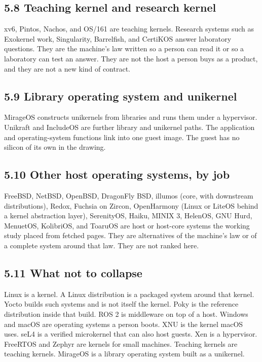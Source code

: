 \documentclass[10pt,letterpaper]{article}
\begin{document}
\subsection{5.8 Teaching kernel and research
kernel}\label{teaching-kernel-and-research-kernel}

xv6, Pintos, Nachos, and OS/161 are teaching kernels. Research systems
such as Exokernel work, Singularity, Barrelfish, and CertiKOS answer
laboratory questions. They are the machine's law written so a person can
read it or so a laboratory can test an answer. They are not the host a
person buys as a product, and they are not a new kind of contract.

\subsection{5.9 Library operating system and
unikernel}\label{library-operating-system-and-unikernel}

MirageOS constructs unikernels from libraries and runs them under a
hypervisor. Unikraft and IncludeOS are further library and unikernel
paths. The application and operating-system functions link into one
guest image. The guest has no silicon of its own in the drawing.

\subsection{5.10 Other host operating systems, by
job}\label{other-host-operating-systems-by-job}

FreeBSD, NetBSD, OpenBSD, DragonFly BSD, illumos (core, with downstream
distributions), Redox, Fuchsia on Zircon, OpenHarmony (Linux or LiteOS
behind a kernel abstraction layer), SerenityOS, Haiku, MINIX 3, HelenOS,
GNU Hurd, MenuetOS, KolibriOS, and ToaruOS are host or host-core systems
the working study placed from fetched pages. They are alternatives of
the machine's law or of a complete system around that law. They are not
ranked here.

\subsection{5.11 What not to collapse}\label{what-not-to-collapse}

Linux is a kernel. A Linux distribution is a packaged system around that
kernel. Yocto builds such systems and is not itself the kernel. Poky is
the reference distribution inside that build. ROS 2 is middleware on top
of a host. Windows and macOS are operating systems a person boots. XNU
is the kernel macOS uses. seL4 is a verified microkernel that can also
host guests. Xen is a hypervisor. FreeRTOS and Zephyr are kernels for
small machines. Teaching kernels are teaching kernels. MirageOS is a
library operating system built as a unikernel.
\end{document}
